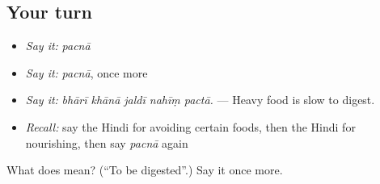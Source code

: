 \subsection*{Your turn}
\begin{itemize}
\raggedright
  \item \emph{Say it:} \emph{pacnā}
  \item \emph{Say it:} \emph{pacnā}, once more
  \item \emph{Say it:} \emph{bhārī khānā jaldī nahīṃ pactā.} — Heavy food is slow to digest.
  \item \emph{Recall:} say the Hindi for avoiding certain foods, then the Hindi for nourishing, then say \emph{pacnā} again
\end{itemize}

\begin{tcolorbox}[breakable,colback=teal!4,colframe=teal!35!black,title={Before you move on}]
What does  mean? (\textquotedblleft{}To be digested\textquotedblright{}.) Say it once more.
\end{tcolorbox}
